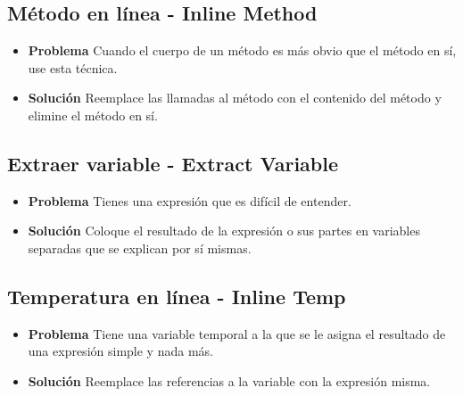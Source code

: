 \documentclass[11pt,a4paper,oneside]{book}
\begin{document}
\subsection{Método en línea - Inline Method}
\label{inlinemethod}
\begin{itemize}
    \item \textbf{Problema} Cuando el cuerpo de un método es más obvio que el método en sí, use esta técnica.
    
    \item \textbf{Solución} Reemplace las llamadas al método con el contenido del método y elimine el método en sí.
    
\end{itemize}

\subsection{Extraer variable - Extract Variable}
\label{extracvariable}
\begin{itemize}
    \item \textbf{Problema} Tienes una expresión que es difícil de entender.
    
    \item \textbf{Solución} Coloque el resultado de la expresión o sus partes en variables separadas que se explican por sí mismas.
    
\end{itemize}
    
\subsection{Temperatura en línea - Inline Temp}
\label{inlinetemp}
\begin{itemize}
    \item \textbf{Problema} Tiene una variable temporal a la que se le asigna el resultado de una expresión simple y nada más.
    
    \item \textbf{Solución} Reemplace las referencias a la variable con la expresión misma.
    
\end{itemize}
    
\end{document}
